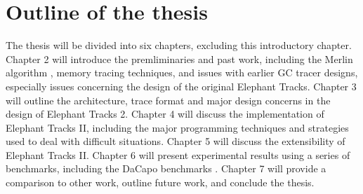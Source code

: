 \section{Outline of the thesis}
The thesis will be divided into six chapters, excluding this introductory chapter. Chapter 2 will introduce the premliminaries and
past work, including the Merlin algorithm \citep{Merlin}, memory tracing techniques, and issues with earlier GC tracer designs,
especially issues concerning the design of the original Elephant Tracks. Chapter 3 will outline the architecture, trace format and
major design concerns in the design of Elephant Tracks 2. Chapter 4 will discuss the implementation of Elephant Tracks II, including
the major programming techniques and strategies used to deal with difficult situations. Chapter 5 will discuss the extensibility of
Elephant Tracks II. Chapter 6 will present experimental results using a series of benchmarks, including the DaCapo
benchmarks \citep{DaCapo}. Chapter 7 will provide a comparison to other work, outline future work, and conclude the thesis.
